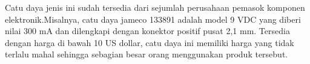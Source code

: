 	Catu daya jenis ini sudah tersedia dari sejumlah perusahaan pemasok komponen elektronik.Misalnya, catu daya jameco 133891 adalah model 9 VDC yang diberi nilai 300 mA dan dilengkapi dengan konektor positif pusat 2,1 mm. Tersedia dengan harga di bawah 10 US dollar, catu daya ini memiliki harga yang tidak terlalu mahal sehingga sebagian besar orang menggunakan produk tersebut.